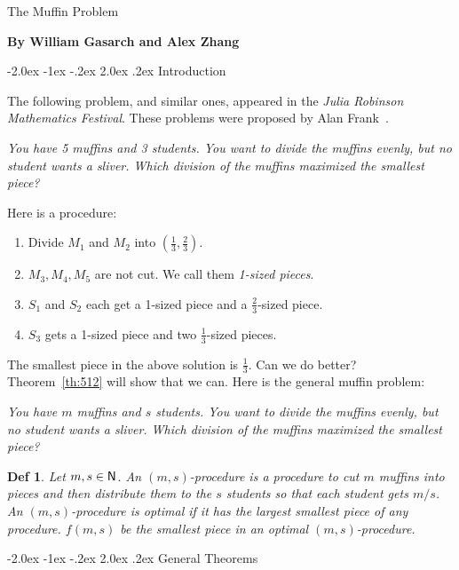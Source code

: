 \documentclass[12pt]{article}
\makeatletter
\renewcommand\section{\@startsection{section}{1}{\z@}%
                                  {-2.0ex \@plus -1ex \@minus -.2ex}%
                                  {2.0ex \@plus.2ex}%
                                  {\normalfont\normalsize\bfseries}}
\newcommand{\nat}{{\sf N}}
\newtheorem{dfntn}[theoremfoo]{Def}
\newenvironment{definition}{\pagebreak[1]\begin{dfntn}\rm}{\end{dfntn}}
\makeatother
\begin{document}
\centerline{The Muffin Problem}

\centerline{\bf By William Gasarch and Alex Zhang}

\section{Introduction}

The following problem, and similar ones, 
appeared in the {\it Julia Robinson Mathematics Festival}.
These problems were
proposed by Alan Frank~\cite{muffin}.

\bigskip

\noindent
{\it You have 5 muffins and 3 students. You want to divide the muffins
evenly, but no student wants a sliver. Which division of the muffins 
maximized the smallest piece?}

\bigskip

Here is a procedure:

\noindent
\begin{enumerate}
\item
Divide $M_1$ and $M_2$ into $(\frac{1}{3},\frac{2}{3})$. 
\item
$M_3,M_4,M_5$ are not cut. We call them {\it 1-sized pieces}.
\item
$S_1$ and $S_2$ each get a  1-sized piece and a $\frac{2}{3}$-sized piece.
\item
$S_3$ gets a 1-sized piece and two $\frac{1}{3}$-sized pieces.
\end{enumerate}

The smallest piece in the above solution is $\frac{1}{3}$. Can we do better?
Theorem~\ref{th:512} will show that we can.
Here is the general muffin problem:

\noindent
{\it You have $m$ muffins and $s$ students. You want to divide the muffins
evenly, but no student wants a sliver. Which division of the muffins 
maximized the smallest piece?}


\begin{definition}
Let $m,s\in\nat$.
An {\it $(m,s)$-procedure} 
is a procedure to cut $m$ muffins into pieces and then
distribute them to the $s$ students so that each student gets $m/s$.
An $(m,s)$-procedure is {\it optimal} if it has the largest smallest piece
of any procedure.
$f(m,s)$ be the smallest piece in an optimal $(m,s)$-procedure.
\end{definition}


\section{General Theorems}
\end{document}
